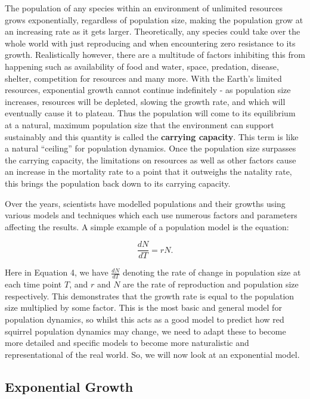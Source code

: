 \documentclass{article}
\begin{document}
The population of any species within an environment of unlimited resources grows exponentially, regardless of population size, making the population grow at an increasing rate as it gets larger. Theoretically, any species could take over the whole world with just reproducing and when encountering zero resistance to its growth. Realistically however, there are a multitude of factors inhibiting this from happening such as availability of food and water, space, predation, disease, shelter, competition for resources and many more. With the Earth’s limited resources, exponential growth cannot continue indefinitely - as population size increases, resources will be depleted, slowing the growth rate, and which will eventually cause it to plateau. Thus the population will come to its equilibrium at a natural, maximum population size that the environment can support sustainably and this quantity is called the \textbf{carrying capacity}. This term is like a natural “ceiling” for population dynamics. Once the population size surpasses the carrying capacity, the limitations on resources as well as other factors cause an increase in the mortality rate to a point that it outweighs the natality rate, this brings the population back down to its carrying capacity. 

Over the years, scientists have modelled populations and their growths using various models and techniques which each use numerous factors and parameters affecting the results. A simple example of a population model is the equation:

\begin{equation}
\frac{dN}{dT}=rN.
\end{equation}

Here in Equation 4, we have $\frac{dN}{dT}$ denoting the rate of change in population size at each time point $T$, and $r$ and $N$ are the rate of reproduction and population size respectively. This demonstrates that the growth rate is equal to the population size multiplied by some factor.  This is the most basic and general model for population dynamics, so whilst this acts as a good model to predict how red squirrel population dynamics may change, we need to adapt these to become more detailed and specific models to become more naturalistic and representational of the real world. So, we will now look at an exponential model.


\subsection{\textbf{Exponential Growth}}
\end{document}
